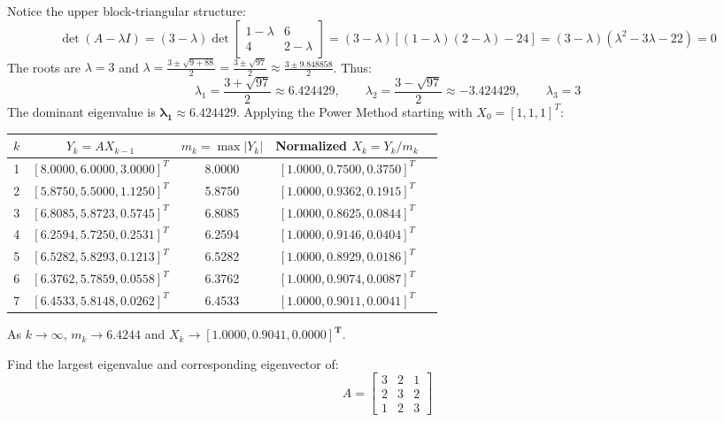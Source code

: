 \documentclass[11pt,a4paper]{article}
\begin{document}
\begin{solbox}
Notice the upper block-triangular structure:
$$\det(A - \lambda I) = (3 - \lambda)\det\begin{bmatrix} 1-\lambda & 6 \\ 4 & 2-\lambda \end{bmatrix} = (3 - \lambda)[(1-\lambda)(2-\lambda) - 24] = (3 - \lambda)(\lambda^2 - 3\lambda - 22) = 0$$
The roots are $\lambda = 3$ and $\lambda = \frac{3 \pm \sqrt{9 + 88}}{2} = \frac{3 \pm \sqrt{97}}{2} \approx \frac{3 \pm 9.848858}{2}$.
Thus:
$$\lambda_1 = \frac{3 + \sqrt{97}}{2} \approx \mathbf{6.424429}, \qquad \lambda_2 = \frac{3 - \sqrt{97}}{2} \approx -3.424429, \qquad \lambda_3 = 3$$
The dominant eigenvalue is $\mathbf{\lambda_1 \approx 6.424429}$.
Applying the Power Method starting with $X_0 = [1, 1, 1]^T$:
\begin{center}
\small
\begin{tabular}{ccccc}
    \toprule
    $k$ & $Y_k = A X_{k-1}$ & $m_k = \max |Y_k|$ & Normalized $X_k = Y_k / m_k$ \\
    \midrule
    1 & $[8.0000, 6.0000, 3.0000]^T$ & 8.0000 & $[1.0000, 0.7500, 0.3750]^T$ \\
    2 & $[5.8750, 5.5000, 1.1250]^T$ & 5.8750 & $[1.0000, 0.9362, 0.1915]^T$ \\
    3 & $[6.8085, 5.8723, 0.5745]^T$ & 6.8085 & $[1.0000, 0.8625, 0.0844]^T$ \\
    4 & $[6.2594, 5.7250, 0.2531]^T$ & 6.2594 & $[1.0000, 0.9146, 0.0404]^T$ \\
    5 & $[6.5282, 5.8293, 0.1213]^T$ & 6.5282 & $[1.0000, 0.8929, 0.0186]^T$ \\
    6 & $[6.3762, 5.7859, 0.0558]^T$ & 6.3762 & $[1.0000, 0.9074, 0.0087]^T$ \\
    7 & $[6.4533, 5.8148, 0.0262]^T$ & 6.4533 & $[1.0000, 0.9011, 0.0041]^T$ \\
    \bottomrule
\end{tabular}
\end{center}
As $k \to \infty$, $m_k \to \mathbf{6.4244}$ and $X_k \to \mathbf{[1.0000, 0.9041, 0.0000]^T}$.
\end{solbox}

\begin{exambox}
Find the largest eigenvalue and corresponding eigenvector of:
$$A = \begin{bmatrix} 3 & 2 & 1 \\ 2 & 3 & 2 \\ 1 & 2 & 3 \end{bmatrix}$$
\end{exambox}
\end{document}
